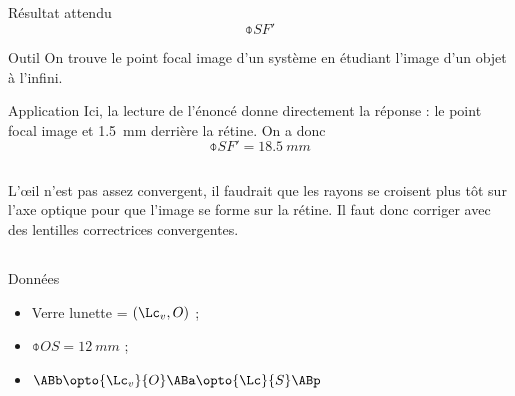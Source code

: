 \documentclass[../main/main.tex]{subfiles}
\begin{document}
\subsection{}
\begin{tcbraster}[raster columns=5, raster equal height=rows]
    \begin{NCprop}{Résultat attendu}
        \[\obar{SF'}\]
    \end{NCprop}
    \begin{NCdemo}[raster multicolumn=2]{Outil}
        On trouve le point focal image d'un système en étudiant l'image d'un
        objet à l'infini.
    \end{NCdemo}
    \begin{NCexem}[raster multicolumn=2]{Application}
        Ici, la lecture de l'énoncé donne directement la réponse : le point
        focal image et \SI{1.5}{mm} derrière la rétine. On a donc \[\obar{SF'} =
        \SI{18.5}{mm}\]
    \end{NCexem}
\end{tcbraster}
\subsection{}
L'œil n'est pas assez convergent, il faudrait que les rayons se croisent plus
tôt sur l'axe optique pour que l'image se forme sur la rétine. Il faut donc
corriger avec des lentilles correctrices convergentes.

\subsection{}
\begin{center}
    \begin{NCdefi}[width=.9\linewidth, sidebyside]{Données}
        \begin{itemize}
            \item Verre lunette = $(\Lc_v, O)$ ;
            \item $\obar{OS} = \SI{12}{mm}$ ;
            \item $\ABb \opto{\Lc_v}{O} \ABa \opto{\Lc}{S} \ABp$
        \end{itemize}
        \tcblower
        \begin{center}
            
        \end{center}
    \end{NCdefi}
\end{center}
\end{document}
